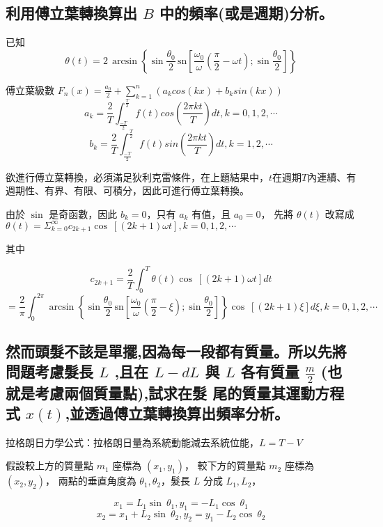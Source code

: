\documentclass[UTF8,a4paper,12pt]{article}
\begin{document}
\subsection{利用傅立葉轉換算出 \texorpdfstring{$B$}{B} 中的頻率(或是週期)分析。}

已知 $$\theta (t) = 2\,\arcsin \left\{ \sin\frac{\theta_0}{2} \, \mbox{sn} \left[ \frac{\omega_0}{\omega}\left(\frac{\pi}{2} - \omega t \right) 
; \sin \frac{\theta_0}{2} \right] \right\}$$

傅立葉級數 $F_n(x) = \frac{a_0}{2} + \sum_{k=1}^{n} (a_k cos(kx) + b_k sin(kx))$
$$a_k = \frac{2}{T} \int_\frac{-T}{2}^\frac{T}{2} f(t) cos(\frac{2\pi kt}{T}) dt, k=0,1,2,\cdots $$
$$b_k = \frac{2}{T} \int_\frac{-T}{2}^\frac{T}{2} f(t) sin(\frac{2\pi kt}{T}) dt, k=1,2,\cdots $$

欲進行傅立葉轉換，必須滿足狄利克雷條件，在上題結果中，$t$在週期$T$內連續、有週期性、有界、有限、可積分，因此可進行傅立葉轉換。

由於 $\sin $ 是奇函數，因此 $b_k = 0$，只有 $a_k$ 有值，且 $a_0 = 0$，
先將 $\theta(t)$ 改寫成 $\theta(t) = \Sigma^\infty_{k=0} c_{2k+1} \cos\ \left[(2k+1)\omega t\right], k=0,1,2,\cdots$

其中

$$c_{2k+1} = \frac{2}{T}\int^T_0 \theta(t) \cos\ \left[(2k+1)\omega t\right] dt$$
$$ = \frac{2}{\pi} \int^{2\pi}_0 \arcsin \left\{ \sin\frac{\theta_0}{2} \, \mbox{sn} \left[ \frac{\omega_0}{\omega}\left(\frac{\pi}{2} - \xi \right) 
; \sin \frac{\theta_0}{2} \right] \right\} \cos\ \left[(2k+1)\xi \right] d\xi,k=0,1,2,\cdots$$



\subsection{然而頭髮不該是單擺,因為每一段都有質量。所以先將問題考慮髮長
\texorpdfstring{$L$}{L} ,且在 \texorpdfstring{$L − dL$}{L-dL} 與 \texorpdfstring{$L$}{L} 
各有質量 \texorpdfstring{$\frac{m}{2}$}{m/2} (也就是考慮兩個質量點),試求在髮
尾的質量其運動方程式 \texorpdfstring{$x(t)$}{x(t)},並透過傅立葉轉換算出頻率分析。}

拉格朗日力學公式：拉格朗日量為系統動能減去系統位能，$L = T - V$

假設較上方的質量點 $m_1$ 座標為 $(x_1,y_1)$，
較下方的質量點 $m_2$ 座標為 $(x_2,y_2)$，
兩點的垂直角度為 $\theta_1, \theta_2$，髮長 $L$ 分成 $L_1,L_2$，

$$x_1=L_1\sin\ \theta_1,y_1=-L_1\cos\ \theta_1$$
$$x_2=x_1+L_2\sin\ \theta_2,y_2=y_1-L_2\cos\ \theta_2$$
\end{document}
